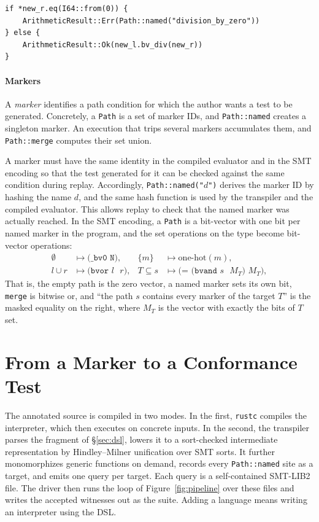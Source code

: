\documentclass[sigconf,screen]{acmart}
\theoremstyle{definition}
\theoremstyle{remark}
\newcommand{\imp}{IMP}
\newcommand{\code}[1]{\texttt{#1}}
\begin{document}
\begin{lstlisting}[style=rust,caption={The division guard of \imp{}'s evaluator.},label={lst:div}]
if *new_r.eq(I64::from(0)) {
    ArithmeticResult::Err(Path::named("division_by_zero"))
} else {
    ArithmeticResult::Ok(new_l.bv_div(new_r))
}
\end{lstlisting}

\paragraph{Markers}
A \emph{marker} identifies a path condition for which the author wants a test to be generated. Concretely, a \code{Path} is a set of marker IDs, and \code{Path::named} creates a singleton marker. An execution that trips several markers accumulates them, and \code{Path::merge} computes their set union.

A marker must have the same identity in the compiled evaluator and in the SMT encoding so that the test generated for it can be checked against the same condition during replay. Accordingly, \code{Path::named("\(d\)")} derives the marker ID by hashing the name \(d\), and the same hash function is used by the transpiler and the compiled evaluator. This allows replay to check that the named marker was actually reached. In the SMT encoding, a \code{Path} is a bit-vector with one bit per named marker in the program, and the set operations on the type become bit-vector operations:
\[
  \begin{aligned}
    \emptyset &\mapsto \texttt{(\_ bv0 N)}, &
    \{m\} &\mapsto \text{one-hot}(m), \\
    l \cup r &\mapsto \texttt{(bvor \(l\) \(r\))}, &
    T \subseteq s &\mapsto \texttt{(= (bvand \(s\) \(M_T\)) \(M_T\))},
  \end{aligned}
\]
That is, the empty path is the zero vector, a named marker sets its own bit,
\code{merge} is bitwise or, and ``the path $s$ contains every marker of the
target $T$'' is the masked equality on the right, where $M_T$ is the vector
with exactly the bits of $T$ set.

\section{From a Marker to a Conformance Test}
\label{sec:pipeline}

The annotated source is compiled in two modes. In the first, \code{rustc}
compiles the interpreter, which then executes on concrete inputs. In the second, the transpiler parses the fragment of \S\ref{sec:dsl}, lowers it to a
sort-checked intermediate representation by Hindley--Milner unification over SMT
sorts. It further monomorphizes generic functions on demand, records every
\code{Path::named} site as a target, and emits one query per target. Each query
is a self-contained SMT-LIB2 file. The driver then runs
the loop of Figure~\ref{fig:pipeline} over these files and writes the accepted
witnesses out as the suite. Adding a language means writing an interpreter using the DSL.
\end{document}
